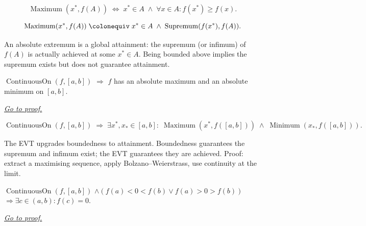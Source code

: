 \begin{remark*}
\[
  \operatorname{Maximum}(x^*,f(A))
  \;\iff\;
  x^*\in A \;\wedge\; \forall x\in A: f(x^*)\geq f(x).
\]
\end{remark*}

\begin{remark*}
\[
  \operatorname{Maximum}(x^*,f(A))
  \;\colonequiv\;
  x^*\in A \;\wedge\; \operatorname{Supremum}(f(x^*),f(A)).
\]
\end{remark*}

\begin{remark*}[Interpretation]
An absolute extremum is a global attainment: the supremum (or
infimum) of $f(A)$ is actually achieved at some $x^*\in A$.
Being bounded above implies the supremum exists but does not
guarantee attainment.
\end{remark*}


\begin{theorem}
\label{thm:extreme-value-theorem}
$\operatorname{ContinuousOn}(f,[a,b])$ $\Rightarrow$ $f$ has an
absolute maximum and an absolute minimum on $[a,b]$.

\smallskip\noindent
\hyperref[prf:evt-maximum-minimum]{\textit{Go to proof.}}
\end{theorem}

\begin{remark*}
\[
  \operatorname{ContinuousOn}(f,[a,b])
  \;\Rightarrow\;
  \exists x^*,x_*\in[a,b]:\;
  \operatorname{Maximum}(x^*,f([a,b]))
  \;\wedge\;
  \operatorname{Minimum}(x_*,f([a,b])).
\]
\end{remark*}

\begin{remark*}[Interpretation]
The EVT upgrades boundedness to attainment. Boundedness guarantees
the supremum and infimum exist; the EVT guarantees they are achieved.
Proof: extract a maximising sequence, apply Bolzano--Weierstrass,
use continuity at the limit.
\end{remark*}


\begin{theorem}
\label{thm:location-of-roots}
$\operatorname{ContinuousOn}(f,[a,b])$
$\wedge(f(a)<0<f(b)\vee f(a)>0>f(b))$
$\Rightarrow\exists c\in(a,b):f(c)=0$.

\smallskip\noindent
\hyperref[prf:locations-of-roots]{\textit{Go to proof.}}
\end{theorem}

